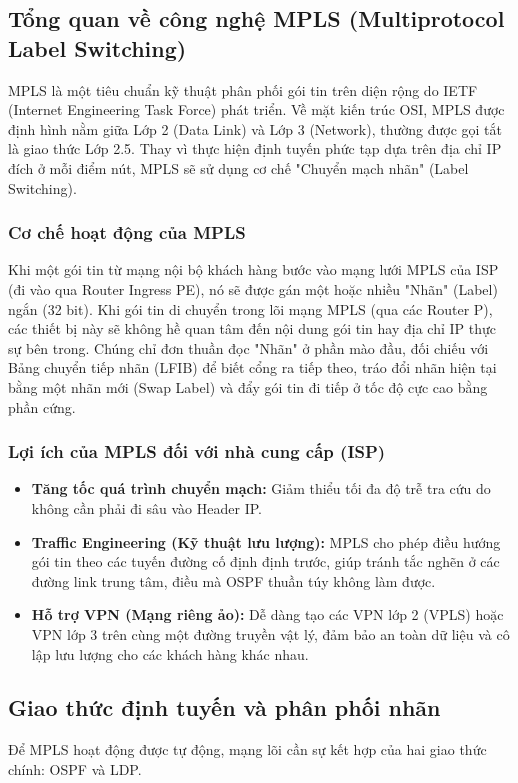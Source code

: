 \subsection{Tổng quan về công nghệ MPLS (Multiprotocol Label Switching)}
MPLS là một tiêu chuẩn kỹ thuật phân phối gói tin trên diện rộng do IETF (Internet Engineering Task Force) phát triển. Về mặt kiến trúc OSI, MPLS được định hình nằm giữa Lớp 2 (Data Link) và Lớp 3 (Network), thường được gọi tắt là giao thức Lớp 2.5. Thay vì thực hiện định tuyến phức tạp dựa trên địa chỉ IP đích ở mỗi điểm nút, MPLS sẽ sử dụng cơ chế "Chuyển mạch nhãn" (Label Switching).

\subsubsection{Cơ chế hoạt động của MPLS}
Khi một gói tin từ mạng nội bộ khách hàng bước vào mạng lưới MPLS của ISP (đi vào qua Router Ingress PE), nó sẽ được gán một hoặc nhiều "Nhãn" (Label) ngắn (32 bit). Khi gói tin di chuyển trong lõi mạng MPLS (qua các Router P), các thiết bị này sẽ không hề quan tâm đến nội dung gói tin hay địa chỉ IP thực sự bên trong. Chúng chỉ đơn thuần đọc "Nhãn" ở phần mào đầu, đối chiếu với Bảng chuyển tiếp nhãn (LFIB) để biết cổng ra tiếp theo, tráo đổi nhãn hiện tại bằng một nhãn mới (Swap Label) và đẩy gói tin đi tiếp ở tốc độ cực cao bằng phần cứng.

\subsubsection{Lợi ích của MPLS đối với nhà cung cấp (ISP)}
\begin{itemize}
    \item \textbf{Tăng tốc quá trình chuyển mạch:} Giảm thiểu tối đa độ trễ tra cứu do không cần phải đi sâu vào Header IP.
    \item \textbf{Traffic Engineering (Kỹ thuật lưu lượng):} MPLS cho phép điều hướng gói tin theo các tuyến đường cố định định trước, giúp tránh tắc nghẽn ở các đường link trung tâm, điều mà OSPF thuần túy không làm được.
    \item \textbf{Hỗ trợ VPN (Mạng riêng ảo):} Dễ dàng tạo các VPN lớp 2 (VPLS) hoặc VPN lớp 3 trên cùng một đường truyền vật lý, đảm bảo an toàn dữ liệu và cô lập lưu lượng cho các khách hàng khác nhau.
\end{itemize}

\subsection{Giao thức định tuyến và phân phối nhãn}
Để MPLS hoạt động được tự động, mạng lõi cần sự kết hợp của hai giao thức chính: OSPF và LDP.

